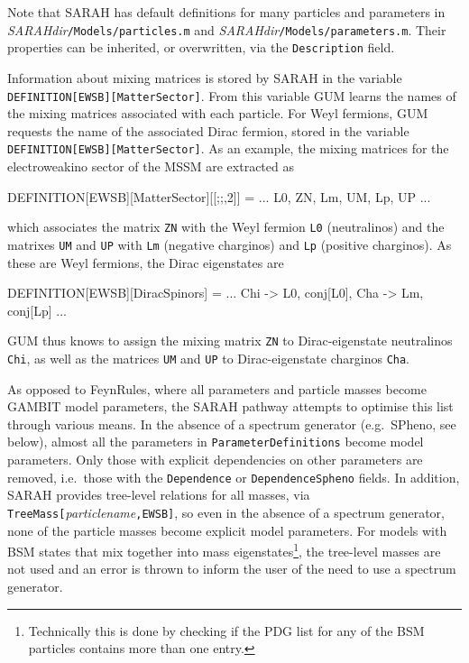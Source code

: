 \documentclass[pdftex,twocolumn,epjc3_preprint,runningheads]{svjour3}
\renewcommand{\_}{\discretionary{\underscore}{}{\underscore}}
\newcommand\term[1]{{\lstset{style=terminal}\lstinline!#1!\lstset{style=cpp}}}
\newcommand\mathematica[1]{{\lstset{style=Mathematica}\lstinline!#1!\lstset{style=cpp}}}
\newcommand{\metavarf}[1]{\textit{\color{darkgreen}\footnotesize\textrm{#1}}}
\newcommand{\metavar}{\metavarf}
\newcommand{\gambit}{\textsf{GAMBIT}\xspace}
\newcommand{\GB}{\gambit}
\newcommand{\gum}{\textsf{GUM}\xspace}
\newcommand{\fr}{\textsf{FeynRules}\xspace}
\newcommand{\sarah}{\textsf{SARAH}\xspace}
\newcommand{\spheno}{\textsf{SPheno}\xspace}
\newcommand{\pn}{\metavar{particle\_name}}
\begin{document}
Note that \sarah has default definitions for many particles and parameters in \metavar{SARAH\_dir}\term{/Models/particles.m} and \metavar{SARAH\_dir}\term{/Models/parameters.m}.  Their properties can be inherited, or overwritten, via the \mathematica{Description} field.

Information about mixing matrices is stored by \sarah in the variable \mathematica{DEFINITION[EWSB][MatterSector]}. From this variable \gum learns the names of the mixing matrices associated with each particle. For Weyl fermions, \gum requests the name of the associated Dirac fermion, stored in the variable \mathematica{DEFINITION[EWSB][MatterSector]}. As an example, the mixing matrices for the electroweakino sector of the MSSM are extracted as
%
\begin{lstmathematica}
 DEFINITION[EWSB][MatterSector][[;;,2]] = {
 ...
   {L0, ZN},
   {{Lm, UM}, {Lp, UP}}
 ...
 }
\end{lstmathematica}
%
which associates the matrix \mathematica{ZN} with the Weyl fermion \mathematica{L0} (neutralinos) and the matrixes \mathematica{UM} and \mathematica{UP} with \mathematica{Lm} (negative charginos) and \mathematica{Lp} (positive charginos). As these are Weyl fermions, the Dirac eigenstates are
%
\begin{lstmathematica}
 DEFINITION[EWSB][DiracSpinors] = {
 ...
   Chi -> {L0, conj[L0]},
   Cha -> {Lm, conj[Lp]}
 ...
 }
\end{lstmathematica}
%
\gum thus knows to assign the mixing matrix \mathematica{ZN} to Dirac-eigenstate neutralinos \mathematica{Chi}, as well as the matrices \mathematica{UM} and \mathematica{UP} to Dirac-eigenstate charginos \mathematica{Cha}.

As opposed to \fr, where all parameters and particle masses become \GB model parameters, the \sarah pathway attempts to optimise this list through various means. In the absence of a spectrum generator (e.g.\ \spheno, see below), almost all the parameters in \mathematica{ParameterDefinitions} become model parameters.  Only those with explicit dependencies on other parameters are removed, i.e.\ those with the \mathematica{Dependence} or \mathematica{DependenceSpheno} fields. In addition, \sarah provides tree-level relations for all masses, via \mathematica{TreeMass[}\pn\mathematica{,EWSB]}, so even in the absence of a spectrum generator, none of the particle masses become explicit model parameters. For models with BSM states that mix together into mass eigenstates\footnote{Technically this is done by checking if the PDG list for any of the BSM particles contains more than one entry.}, the tree-level masses are not used and an error is thrown to inform the user of the need to use a spectrum generator.
\end{document}
